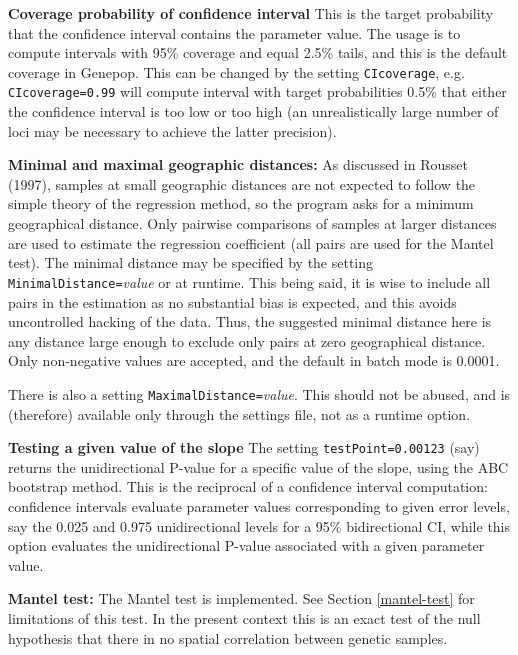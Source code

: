 \documentclass[12pt,]{book}
\theoremstyle{definition}
\theoremstyle{definition}
\theoremstyle{definition}
\theoremstyle{remark}
\begin{document}
\textbf{Coverage probability of confidence interval} This is the target
probability that the confidence interval contains the parameter value.
The usage is to compute intervals with 95\% coverage and equal 2.5\%
tails, and this is the default coverage in Genepop. This can be changed
by the setting \texttt{CIcoverage}, e.g. \texttt{CIcoverage=0.99} will
compute interval with target probabilities 0.5\% that either the
confidence interval is too low or too high (an unrealistically large
number of loci may be necessary to achieve the latter
precision).

\textbf{Minimal and maximal geographic distances:} As discussed in
Rousset (1997), samples at small geographic distances are not expected
to follow the simple theory of the regression method, so the program
asks for a minimum geographical distance. Only pairwise comparisons of
samples at larger distances are used to estimate the regression
coefficient (all pairs are used for the Mantel test). The minimal
distance may be specified by the setting
\texttt{MinimalDistance=}\emph{value} or
at runtime. This being said, it is wise to include all pairs in the
estimation as no substantial bias is expected, and this avoids
uncontrolled hacking of the data. Thus, the suggested minimal distance
here is any distance large enough to exclude only pairs at zero
geographical distance. Only non-negative values are accepted, and the
default in batch mode is 0.0001.

There is also a setting
\texttt{MaximalDistance=}\emph{value}.
This should not be abused, and is (therefore) available only through the
settings file, not as a runtime option.

\textbf{Testing a given value of the slope} The setting
\texttt{testPoint=0.00123} (say) returns the unidirectional P-value for
a specific value of the slope, using the ABC bootstrap method. This is
the reciprocal of a confidence interval computation: confidence
intervals evaluate parameter values corresponding to given error levels,
say the 0.025 and 0.975 unidirectional levels for a 95\% bidirectional
CI, while this option evaluates the unidirectional P-value associated
with a given parameter value.

\textbf{Mantel test:} The Mantel test is implemented.
See Section \ref{mantel-test} for limitations of this test. In the
present context this is an exact test of the null hypothesis that there
in no spatial correlation between genetic samples.
\end{document}
